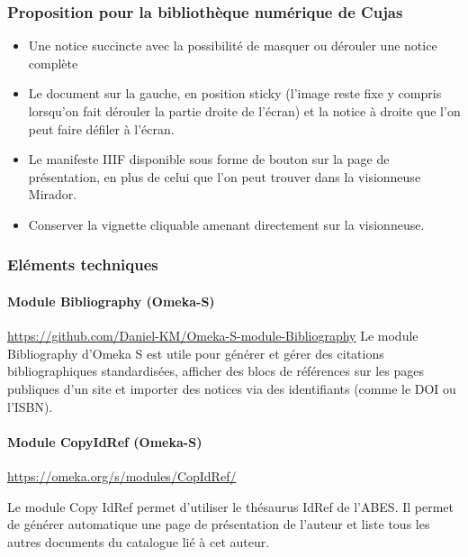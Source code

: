 \subsubsection{Proposition pour la bibliothèque numérique de Cujas}
\begin{itemize}
	\item Une notice succincte avec la possibilité de masquer ou dérouler une notice complète 
\item  Le document sur la gauche, en position sticky (l’image reste fixe y compris lorsqu’on fait dérouler la partie droite de l’écran) et la notice à droite que l’on peut faire défiler à l’écran.
\item Le manifeste IIIF disponible sous forme de bouton sur la page de présentation, en plus de celui que l’on peut trouver dans la visionneuse Mirador.
\item Conserver la vignette cliquable amenant directement sur la visionneuse.
\end{itemize}

\subsubsection{Eléments techniques}

\paragraph*{Module Bibliography (Omeka-S)}

\url{https://github.com/Daniel-KM/Omeka-S-module-Bibliography}
Le module Bibliography d’Omeka S est utile pour générer et gérer des citations bibliographiques standardisées, afficher des blocs de références sur les pages publiques d’un site et importer des notices via des identifiants (comme le DOI ou l’ISBN).

\paragraph*{Module CopyIdRef (Omeka-S)}

\url{https://omeka.org/s/modules/CopIdRef/}

Le module Copy IdRef permet d’utiliser le thésaurus IdRef de l’ABES. Il permet de générer automatique une page de présentation de l’auteur et liste tous les autres documents du catalogue lié à cet auteur. 


